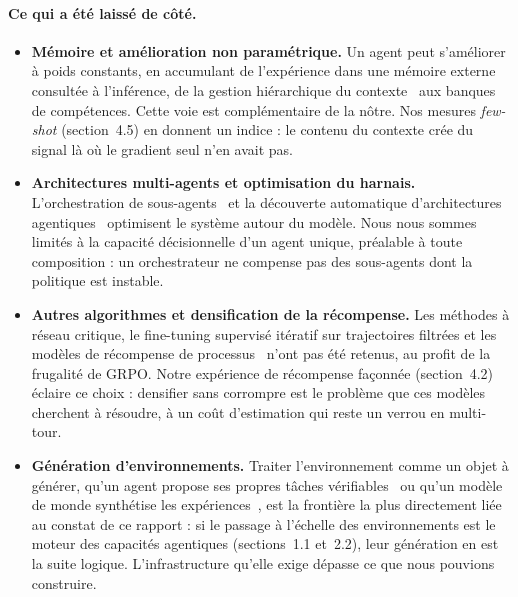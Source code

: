 \documentclass[11pt,a4paper]{article}
\begin{document}
\paragraph{Ce qui a été laissé de côté.}
\begin{itemize}
    \item \textbf{Mémoire et amélioration non paramétrique.} Un agent peut s'améliorer à poids constants, en accumulant de l'expérience dans une mémoire externe consultée à l'inférence, de la gestion hiérarchique du contexte~\cite{packer_memgpt_2023} aux banques de compétences. Cette voie est complémentaire de la nôtre. Nos mesures \emph{few-shot} (section~4.5) en donnent un indice : le contenu du contexte crée du signal là où le gradient seul n'en avait pas.
    \item \textbf{Architectures multi-agents et optimisation du harnais.} L'orchestration de sous-agents~\cite{kimi_k25_2026} et la découverte automatique d'architectures agentiques~\cite{hu_adas_2025} optimisent le système autour du modèle. Nous nous sommes limités à la capacité décisionnelle d'un agent unique, préalable à toute composition : un orchestrateur ne compense pas des sous-agents dont la politique est instable.
    \item \textbf{Autres algorithmes et densification de la récompense.} Les méthodes à réseau critique, le fine-tuning supervisé itératif sur trajectoires filtrées et les modèles de récompense de processus~\cite{lightman2023verify} n'ont pas été retenus, au profit de la frugalité de GRPO. Notre expérience de récompense façonnée (section~4.2) éclaire ce choix : densifier sans corrompre est le problème que ces modèles cherchent à résoudre, à un coût d'estimation qui reste un verrou en multi-tour.
    \item \textbf{Génération d'environnements.} Traiter l'environnement comme un objet à générer, qu'un agent propose ses propres tâches vérifiables~\cite{zhou2025sca} ou qu'un modèle de monde synthétise les expériences~\cite{dreamgym2025}, est la frontière la plus directement liée au constat de ce rapport : si le passage à l'échelle des environnements est le moteur des capacités agentiques (sections~1.1 et~2.2), leur génération en est la suite logique. L'infrastructure qu'elle exige dépasse ce que nous pouvions construire.
\end{itemize}
\end{document}

